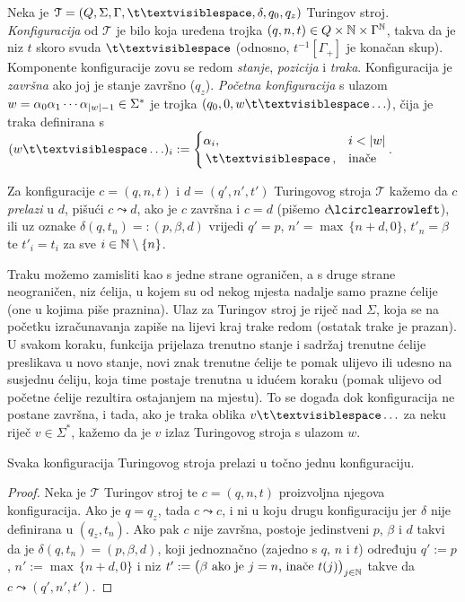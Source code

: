 \begin{definicija}[{name=[Turing-konfiguracije i prijelazi među njima]}]
Neka je $\mathcal T=(Q,\Sigma,\Gamma,\bl,\delta,q_0,q_z)$ Turingov stroj. \emph{Konfiguracija} od $\mathcal T$ je bilo koja uređena trojka $(q,n,t)\in Q\times{\mathbb N}\times\Gamma^{\mathbb N}$, takva da je niz $t$ skoro svuda $\bl$ (odnosno, $t^{-1}[\Gamma_+]$ je konačan skup). Komponente konfiguracije zovu se redom \emph{stanje}, \emph{pozicija} i \emph{traka}. Konfiguracija je \emph{završna} ako joj je stanje završno ($q_z$). \emph{Početna konfiguracija} s ulazom $w=\alpha_0\alpha_1\dotsm\alpha_{\lvert w\rvert-1}\in\Sigma^*$ je trojka $(q_0,0,w\bl\ldots)$, čija je traka definirana s $(w\bl\ldots)_i:=\begin{cases}
\alpha_i,&i<\dulj{w}\\
\,\bl\,,&\text{inače}
\end{cases}$.

	Za konfiguracije $c=(q,n,t)$ i $d=(q',n',t')$ Turingovog stroja $\mathcal T$ kažemo da $c$ \emph{prelazi} u $d$, pišući $c\leadsto d$, ako je $c$ završna i $c=d$ (pišemo $c\!\lcirclearrowleft$), ili uz oznake $\delta(q,t_n)=:(p,\beta,d)$ vrijedi $q'=p$, $n'=\max\,\{n+d,0\}$, $t'_n=\beta$ te $t'_i=t_i$ za sve $i\in{\mathbb N}\setminus\{n\}$.
\end{definicija}

Traku možemo zamisliti kao s jedne strane ograničen, a s druge strane neograničen, niz ćelija, u kojem su od nekog mjesta nadalje samo prazne ćelije (one u kojima piše praznina). Ulaz za Turingov stroj je riječ nad $\Sigma$, koja se na početku izračunavanja zapiše na lijevi kraj trake redom (ostatak trake je prazan). U svakom koraku, funkcija prijelaza trenutno stanje i sadržaj trenutne ćelije preslikava u novo stanje, novi znak trenutne ćelije te pomak ulijevo ili udesno na susjednu ćeliju, koja time postaje trenutna u idućem koraku (pomak ulijevo od početne ćelije rezultira ostajanjem na mjestu). To se događa dok konfiguracija ne postane završna, i tada, ako je traka oblika $v\bl\ldots$ za neku riječ $v\in\Sigma^*$, kažemo da je $v$ izlaz Turingovog stroja s ulazom $w$.

\begin{lema}[{name=[determinističnost Turingovih strojeva]}]\label{lm:Turingdet}
Svaka konfiguracija Turingovog stroja prelazi u točno jednu konfiguraciju.%
\end{lema}
\begin{proof}
	Neka je $\mathcal T$ Turingov stroj te $c=(q,n,t)$ proizvoljna njegova konfiguracija. Ako je $q=q_z$, tada $c\leadsto c$, i ni u koju drugu konfiguraciju jer $\delta$ nije definirana u $(q_z,t_n)$. Ako pak $c$ nije završna, postoje jedinstveni $p$, $\beta$ i $d$ takvi da je $\delta(q,t_n)=(p,\beta,d)$, koji jednoznačno (zajedno s $q$, $n$ i $t$) određuju $q':=p$, $n':=\max\,\{n+d,0\}$ i niz $t':=\bigl(\text{$\beta$ ako je $j=n$, inače $t(j)$}\bigl)_{j\in{\mathbb N}}$ takve da $c\leadsto(q',n',t')$.
\end{proof}

